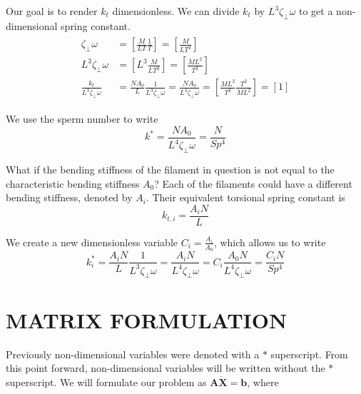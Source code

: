\documentclass[12pt,letterpaper,titlepage]{article}
\begin{document}
Our goal is to render $k_t$ dimensionless. We can divide $k_t$ by $L^3 \zeta_{\bot} \omega$ to get a non-dimensional spring constant.
\begin{align}
\begin{split}
\zeta_{\bot} \omega &= [\frac{M}{LT} \frac{1}{T}] = [\frac{M}{LT^2}] \\
L^3 \zeta_{\bot} \omega &= [L^3 \frac{M}{LT^2}] = [\frac{ML^2}{T^2}] \\
\frac{k_t}{L^3 \zeta_{\bot} \omega} &= \frac{NA_0}{L} \frac{1}{L^3 \zeta_{\bot} \omega} = \frac{NA_0}{L^4 \zeta_{\bot} \omega} = [\frac{ML^2}{T^2} \frac{T^2}{ML^2}] = [1]
\end{split}
\end{align}

We use the sperm number to write
\begin{equation}
k^* = \frac{NA_0}{L^4 \zeta_{\bot} \omega} = \frac{N}{Sp^4}
\end{equation}

What if the bending stiffness of the filament in question is not equal to the characteristic bending stiffness $A_0$? Each of the filaments could have a different bending stiffness, denoted by $A_i$. Their equivalent torsional spring constant is
\begin{equation}
k_{t,i} = \frac{A_i N}{L}
\end{equation}

We create a new dimensionless variable $C_i = \frac{A_i}{A_0}$, which allows us to write
\begin{equation}
k_i^* = \frac{A_i N}{L} \frac{1}{L^3 \zeta_{\bot} \omega} = \frac{A_i N}{L^4 \zeta_{\bot} \omega} = C_i \frac{A_0 N}{L^4 \zeta_{\bot} \omega} = \frac{C_i N}{Sp^4}
\end{equation}

\newpage
\section{MATRIX FORMULATION}
Previously non-dimensional variables were denoted with a $*$ superscript. From this point forward, non-dimensional variables will be written without the $*$ superscript. We will formulate our problem as $\mathbf{A} \mathbf{\dot{X}} = \mathbf{b}$, where
\end{document}
